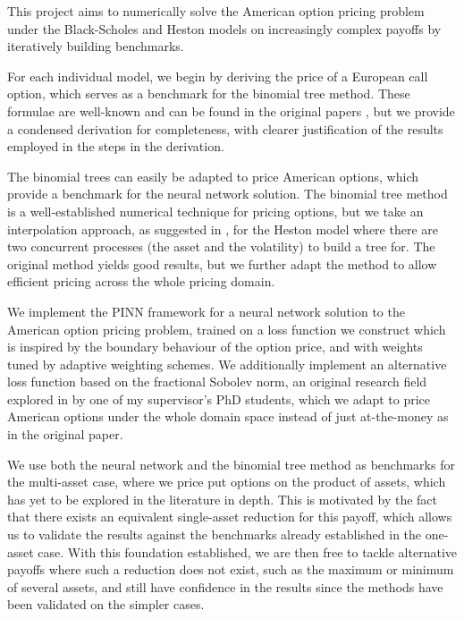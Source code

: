 This project aims to numerically solve the American option pricing problem under the Black-Scholes and Heston models on increasingly complex payoffs by iteratively building benchmarks.

For each individual model, we begin by deriving the price of a European call option, which serves as a benchmark for the binomial tree method. These formulae are well-known and can be found in the original papers \cite{black1973pricing,heston1993closed}, but we provide a condensed derivation for completeness, with clearer justification of the results employed in the steps in the derivation.

The binomial trees can easily be adapted to price American options, which provide a benchmark for the neural network solution. The binomial tree method is a well-established numerical technique for pricing options, but we take an interpolation approach, as suggested in \cite{vellekoop2009tree}, for the Heston model where there are two concurrent processes (the asset and the volatility) to build a tree for. The original method yields good results, but we further adapt the method to allow efficient pricing across the whole pricing domain.

We implement the PINN framework for a neural network solution to the American option pricing problem, trained on a loss function we construct which is inspired by the boundary behaviour of the option price, and with weights tuned by adaptive weighting schemes. We additionally implement an alternative loss function based on the fractional Sobolev norm, an original research field explored in \cite{zhao2025fractional} by one of my supervisor's PhD students, which we adapt to price American options under the whole domain space instead of just at-the-money as in the original paper.

We use both the neural network and the binomial tree method as benchmarks for the multi-asset case, where we price put options on the product of assets, which has yet to be explored in the literature in depth. This is motivated by the fact that there exists an equivalent single-asset reduction for this payoff, which allows us to validate the results against the benchmarks already established in the one-asset case. With this foundation established, we are then free to tackle alternative payoffs where such a reduction does not exist, such as the maximum or minimum of several assets, and still have confidence in the results since the methods have been validated on the simpler cases.

